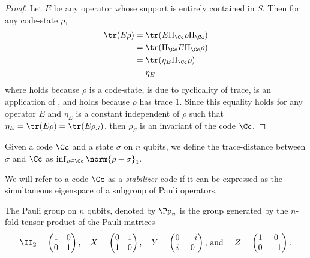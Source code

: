 \documentclass{toc}
\begin{document}
\begin{proof}
Let $E$ be any operator whose support is entirely contained in $S$. Then for any code-state $\rho$,
\begin{align}
\tr(E\rho) &= \tr(E \Pi_\Cc \rho \Pi_\Cc) \label{eq:li-codedef1} \\
&= \tr(\Pi_\Cc E \Pi_\Cc \rho) \label{eq:li-ct} \\
&= \tr(\eta_E \Pi_\Cc \rho) \label{eq:li-codedef2} \\
&= \eta_E \label{eq:li-tr1}
\end{align}
where  %
holds  %
because $\rho$ is a code-state,  is due to cyclicality of trace,
  is an application of , 
and  %
holds  %
because $\rho$ has trace 1. Since this equality holds for any operator $E$ and $\eta_E$ is a constant independent of $\rho$ such that $\eta_E = \tr(E\rho) = \tr(E \rho_S)$, then $\rho_S$ is an invariant of the code $\Cc$.
\end{proof}


Given a code $\Cc$ and a state $\sigma$ on $n$ qubits, we define the trace-distance between $\sigma$ and $\Cc$ as $    \inf_{\rho \in \Cc} \norm{\rho - \sigma}_1.$

We will refer to a code $\Cc$ as a \emph{stabilizer} code if it can be expressed as the simultaneous eigenspace of a subgroup of Pauli operators.

\begin{definition}
The Pauli group on $n$ qubits, denoted by $\Pp_n$ is the group generated by the $n$-fold tensor product of the Pauli matrices
\begin{align}
    \II_2 = \begin{pmatrix} 1 & 0 \\ 0 & 1\end{pmatrix}, \quad X = \begin{pmatrix} 0 & 1 \\ 1 & 0 \end{pmatrix}, \quad Y = \begin{pmatrix} 0 & -i \\i & 0\end{pmatrix} \textrm{, and }\quad Z = \begin{pmatrix} 1 & 0 \\ 0 & -1\end{pmatrix}.
\end{align}
\end{definition}
\end{document}
